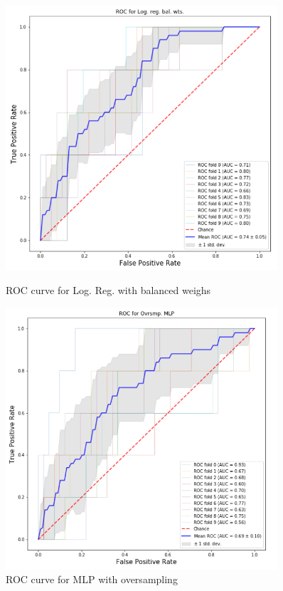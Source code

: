 \begin{figure}[h]
    \centering
    \begin{minipage}{0.45\textwidth}
        \centering
        \includegraphics[width=0.9\textwidth]{results/fig/roclog.PNG} %
        \caption{ROC curve for Log. Reg. with balanced weighs}
        \label{fig:roclog}
    \end{minipage}\hfill
    \begin{minipage}{0.45\textwidth}
        \centering
        \includegraphics[width=0.9\textwidth]{results/fig/rocmlp.PNG} %
        \caption{ROC curve for MLP with oversampling}
        \label{fig:rocmlp}
    \end{minipage}

\end{figure}

